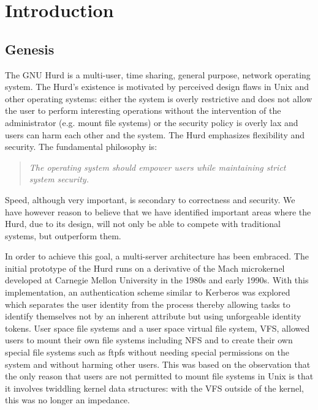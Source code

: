 \chapter{Introduction}

\section{Genesis}

The GNU Hurd is a multi-user, time sharing, general purpose, network
operating system.  The Hurd's existence is motivated by perceived
design flaws in Unix and other operating systems: either the system is
overly restrictive and does not allow the user to perform interesting
operations without the intervention of the administrator (e.g. mount
file systems) or the security policy is overly lax and users can harm
each other and the system.  The Hurd emphasizes flexibility and
security.  The fundamental philosophy is:

\begin{quote}
  \emph{The operating system should empower users while maintaining
  strict system security.}
\end{quote}

\noindent
Speed, although very important, is secondary to correctness and
security.  We have however reason to believe that we have identified
important areas where the Hurd, due to its design, will not only be
able to compete with traditional systems, but outperform them.

In order to achieve this goal, a multi-server architecture has been
embraced.  The initial prototype of the Hurd runs on a derivative of
the Mach microkernel developed at Carnegie Mellon University in the
1980s and early 1990s.  With this implementation, an authentication
scheme similar to Kerberos was explored which separates the user
identity from the process thereby allowing tasks to identify
themselves not by an inherent attribute but using unforgeable identity
tokens.  User space file systems and a user space virtual file system,
VFS, allowed users to mount their own file systems including NFS and
to create their own special file systems such as ftpfs without needing
special permissions on the system and without harming other users.
This was based on the observation that the only reason that users are
not permitted to mount file systems in Unix is that it involves
twiddling kernel data structures: with the VFS outside of the kernel,
this was no longer an impedance.

